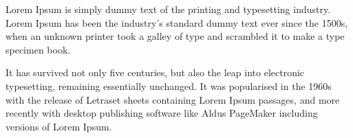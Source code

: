 
Lorem Ipsum is simply dummy text of the printing and typesetting
industry. Lorem Ipsum has been the industry's standard dummy text
ever since the 1500s, when an unknown printer took a galley of
type and scrambled it to make a type specimen book.

It has survived not only five centuries, but also the leap into
electronic typesetting, remaining essentially unchanged. It was
popularised in the 1960s with the release of Letraset sheets
containing Lorem Ipsum passages, and more recently with desktop
publishing software like Aldus PageMaker including versions of
Lorem Ipsum.
